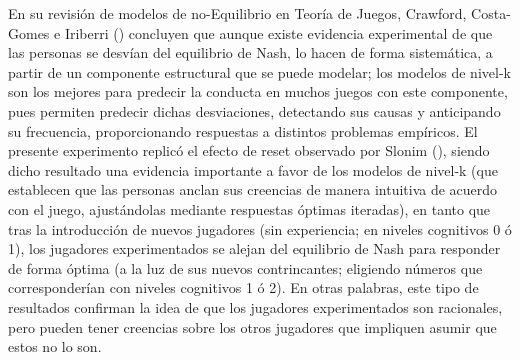 En su revisión de modelos de no-Equilibrio en Teoría de Juegos, Crawford, Costa-Gomes e Iriberri (\citeyear{Crawford}) concluyen que aunque existe evidencia experimental de que las personas se desvían del equilibrio de Nash, lo hacen de forma sistemática, a partir de un componente estructural que se puede modelar; los modelos de nivel-k son los mejores para predecir la conducta en muchos juegos con este componente, pues permiten predecir dichas desviaciones, detectando sus causas y anticipando su frecuencia, proporcionando respuestas a distintos problemas empíricos. El presente experimento replicó el efecto de reset observado por Slonim (\citeyear{Slonim}), siendo dicho resultado una evidencia importante a favor de los modelos de nivel-k (que establecen que las personas anclan sus creencias de manera intuitiva de acuerdo con el juego, ajustándolas mediante respuestas óptimas iteradas), en tanto que tras la introducción de nuevos jugadores (sin experiencia; en niveles cognitivos 0 ó 1), los jugadores experimentados se alejan del equilibrio de Nash para responder de forma óptima (a la luz de sus nuevos contrincantes; eligiendo números que corresponderían con niveles cognitivos 1 ó 2). En otras palabras, este tipo de resultados confirman la idea de que los jugadores experimentados son racionales, pero pueden tener  creencias sobre los otros jugadores que impliquen asumir que estos no lo son.\\
